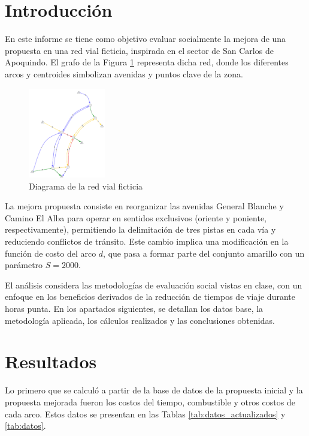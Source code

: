 \documentclass[letterpaper,12pt]{article}
\begin{document}
\newpage
\section{Introducción}

En este informe se tiene como objetivo evaluar socialmente la mejora de una propuesta en una red vial ficticia, inspirada en el sector de San Carlos de Apoquindo. El grafo de la Figura \ref{fig:imagen1} representa dicha red, donde los diferentes arcos y centroides simbolizan avenidas y puntos clave de la zona. 


\begin{figure}[h]
    \centering
    \includegraphics[width=0.3\textwidth]{FOTOS/diagrama.png}
    \caption{Diagrama de la red vial ficticia}
    \label{fig:imagen1}
\end{figure}



La mejora propuesta consiste en reorganizar las avenidas General Blanche y Camino El Alba para operar en sentidos exclusivos (oriente y poniente, respectivamente), permitiendo la delimitación de tres pistas en cada vía y reduciendo conflictos de tránsito. Este cambio implica una modificación en la función de costo del arco $d$, que pasa a formar parte del conjunto amarillo con un parámetro $S = 2000$.

El análisis considera las metodologías de evaluación social vistas en clase, con un enfoque en los beneficios derivados de la reducción de tiempos de viaje durante horas punta. En los apartados siguientes, se detallan los datos base, la metodología aplicada, los cálculos realizados y las conclusiones obtenidas.

\newpage
\section{Resultados}

Lo primero que se calculó a partir de la base de datos de la propuesta inicial y la propuesta mejorada fueron los costos del tiempo, combustible y otros costos de cada arco. Estos datos se presentan en las Tablas \ref{tab:datos_actualizados} y \ref{tab:datos}.
\end{document}
